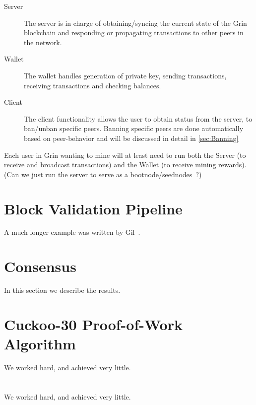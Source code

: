 \documentclass[12pt]{article}
\begin{document}
\begin{description}

	\item [Server] The server is in charge of obtaining/syncing the current state of the Grin blockchain and responding or propagating transactions to other peers in the network.
	\item [Wallet] The wallet handles generation of private key, sending transactions, receiving transactions and checking balances.
	\item [Client] The client functionality allows the user to obtain status from the server, to ban/unban specific peers. Banning specific peers are done automatically based on peer-behavior and will be discussed in detail in \ref{sec:Banning}

\end{description}

Each user in Grin wanting to mine will at least need to run both the Server (to receive and broadcast transactions) and the Wallet (to receive mining rewards). (Can we just run the server to serve as a bootnode/seednodes\ ?)


\section{Block Validation Pipeline}\label{block_validation}
A much longer \LaTeXe{} example was written by Gil~\cite{Gil:02}.

\section{Consensus}\label{results}
In this section we describe the results.

\section{Cuckoo-30 Proof-of-Work Algorithm}\label{POW}
We worked hard, and achieved very little.

\section{}\label{conclusions}
We worked hard, and achieved very little.



\end{document}
